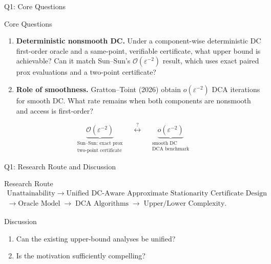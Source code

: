 \documentclass[10pt]{beamer}
\begin{document}
\begin{frame}{Q1: Core Questions}

\begin{block}{Core Questions}
\begin{enumerate}\setlength{\itemsep}{3pt}
\item \textbf{Deterministic nonsmooth DC.}
Under a component-wise deterministic DC first-order oracle and a
same-point, verifiable certificate, what upper bound is achievable?
Can it match Sun--Sun's $\mathcal O(\varepsilon^{-2})$ result,
which uses exact paired prox evaluations and a two-point certificate?

\item \textbf{Role of smoothness.}
Gratton--Toint (2026) obtain $o(\varepsilon^{-2})$ DCA iterations
for smooth DC. What rate remains when both components are nonsmooth
and access is first-order?
\end{enumerate}

\[
\underbrace{\mathcal O(\varepsilon^{-2})}_{\substack{\text{Sun--Sun: exact prox}\\
\text{two-point certificate}}}
\quad\stackrel{?}{\longleftrightarrow}\quad
\underbrace{o(\varepsilon^{-2})}_{\substack{\text{smooth DC}\\
\text{DCA benchmark}}}
\]
\end{block}

\end{frame}

\begin{frame}{Q1: Research Route and Discussion}

\begin{block}{Research Route}
\footnotesize
\[
\begin{gathered}
\text{Unattainability}
\;\to\;
\text{Unified DC-Aware Approximate Stationarity Certificate Design}
\\[-1mm]
\to
\text{Oracle Model}
\;\to\;
\text{DCA Algorithms}
\;\to\;
\text{Upper/Lower Complexity}.
\end{gathered}
\]
\end{block}

\begin{block}{Discussion}
\begin{enumerate}
    \item Can the existing upper-bound analyses be unified?
    \item Is the motivation sufficiently compelling?
\end{enumerate}
\end{block}

\end{frame}
\end{document}
